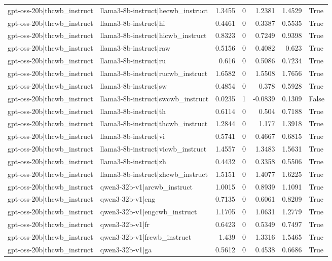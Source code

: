 \begin{table}
\begin{tabular}{l l r r r r l}
gpt-oss-20b|thcwb_instruct & llama3-8b-instruct|hecwb_instruct & 1.3455 & 0 & 1.2381 & 1.4529 & True \\
gpt-oss-20b|thcwb_instruct & llama3-8b-instruct|hi & 0.4461 & 0 & 0.3387 & 0.5535 & True \\
gpt-oss-20b|thcwb_instruct & llama3-8b-instruct|hicwb_instruct & 0.8323 & 0 & 0.7249 & 0.9398 & True \\
gpt-oss-20b|thcwb_instruct & llama3-8b-instruct|raw & 0.5156 & 0 & 0.4082 & 0.623 & True \\
gpt-oss-20b|thcwb_instruct & llama3-8b-instruct|ru & 0.616 & 0 & 0.5086 & 0.7234 & True \\
gpt-oss-20b|thcwb_instruct & llama3-8b-instruct|rucwb_instruct & 1.6582 & 0 & 1.5508 & 1.7656 & True \\
gpt-oss-20b|thcwb_instruct & llama3-8b-instruct|sw & 0.4854 & 0 & 0.378 & 0.5928 & True \\
gpt-oss-20b|thcwb_instruct & llama3-8b-instruct|swcwb_instruct & 0.0235 & 1 & -0.0839 & 0.1309 & False \\
gpt-oss-20b|thcwb_instruct & llama3-8b-instruct|th & 0.6114 & 0 & 0.504 & 0.7188 & True \\
gpt-oss-20b|thcwb_instruct & llama3-8b-instruct|thcwb_instruct & 1.2844 & 0 & 1.177 & 1.3918 & True \\
gpt-oss-20b|thcwb_instruct & llama3-8b-instruct|vi & 0.5741 & 0 & 0.4667 & 0.6815 & True \\
gpt-oss-20b|thcwb_instruct & llama3-8b-instruct|vicwb_instruct & 1.4557 & 0 & 1.3483 & 1.5631 & True \\
gpt-oss-20b|thcwb_instruct & llama3-8b-instruct|zh & 0.4432 & 0 & 0.3358 & 0.5506 & True \\
gpt-oss-20b|thcwb_instruct & llama3-8b-instruct|zhcwb_instruct & 1.5151 & 0 & 1.4077 & 1.6225 & True \\
gpt-oss-20b|thcwb_instruct & qwen3-32b-v1|arcwb_instruct & 1.0015 & 0 & 0.8939 & 1.1091 & True \\
gpt-oss-20b|thcwb_instruct & qwen3-32b-v1|eng & 0.7135 & 0 & 0.6061 & 0.8209 & True \\
gpt-oss-20b|thcwb_instruct & qwen3-32b-v1|engcwb_instruct & 1.1705 & 0 & 1.0631 & 1.2779 & True \\
gpt-oss-20b|thcwb_instruct & qwen3-32b-v1|fr & 0.6423 & 0 & 0.5349 & 0.7497 & True \\
gpt-oss-20b|thcwb_instruct & qwen3-32b-v1|frcwb_instruct & 1.439 & 0 & 1.3316 & 1.5465 & True \\
gpt-oss-20b|thcwb_instruct & qwen3-32b-v1|ga & 0.5612 & 0 & 0.4538 & 0.6686 & True \\

\end{tabular}
\end{table}
